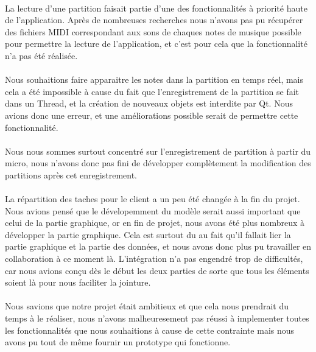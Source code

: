 \paragraph{}
La lecture d'une partition faisait partie d'une des fonctionnalités à priorité haute de l'application. Après 
de nombreuses recherches nous n'avons pas pu récupérer des fichiers MIDI correspondant aux sons de chaques 
notes de musique possible pour permettre la lecture de l'application, et c'est pour cela que la fonctionnalité 
n'a pas été réalisée.

\paragraph{}
Nous souhaitions faire apparaitre les notes dans la partition en temps réel, mais cela a été impossible à cause 
du fait que l'enregistrement de la partition se fait dans un Thread, et la création de nouveaux objets est 
interdite par Qt. Nous avions donc une erreur, et une améliorations possible serait de permettre cette fonctionnalité.

\paragraph{}
Nous nous sommes surtout concentré sur l'enregistrement de partition à partir du micro, nous n'avons donc pas fini 
de développer complètement la modification des partitions après cet enregistrement.

\paragraph{}
La répartition des taches pour le client a un peu été changée à la fin du projet. Nous avions pensé que le dévelopemment 
du modèle serait aussi important que celui de la partie graphique, or en fin de projet, nous avons été plus nombreux à 
développer la partie graphique. Cela est surtout du au fait qu'il fallait lier la partie graphique et la partie des données, 
et nous avons donc plus pu travailler en collaboration à ce moment là. L'intégration n'a pas engendré trop de difficultés, car 
nous avions conçu dès le début les deux parties de sorte que tous les éléments soient là pour nous faciliter la jointure. 

\paragraph{}
Nous savions que notre projet était ambitieux et que cela nous prendrait du temps à le réaliser, nous n'avons malheuresement 
pas réussi à implementer toutes les fonctionnalités que nous souhaitions à cause de cette contrainte mais nous avons pu 
tout de même fournir un prototype qui fonctionne.